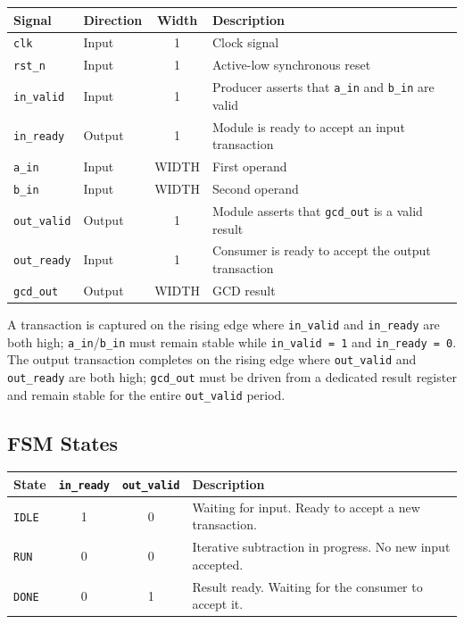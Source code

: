 \documentclass[11pt,a4paper]{article}
\begin{document}
\begin{table}[H]
\centering
\begin{tabular}{llcp{7.5cm}}
\toprule
Signal & Direction & Width & Description \\
\midrule
\texttt{clk}       & Input  & 1     & Clock signal \\
\texttt{rst\_n}    & Input  & 1     & Active-low synchronous reset \\
\texttt{in\_valid} & Input  & 1     & Producer asserts that \texttt{a\_in} and \texttt{b\_in} are valid \\
\texttt{in\_ready} & Output & 1     & Module is ready to accept an input transaction \\
\texttt{a\_in}     & Input  & WIDTH & First operand \\
\texttt{b\_in}     & Input  & WIDTH & Second operand \\
\texttt{out\_valid}& Output & 1     & Module asserts that \texttt{gcd\_out} is a valid result \\
\texttt{out\_ready}& Input  & 1     & Consumer is ready to accept the output transaction \\
\texttt{gcd\_out}  & Output & WIDTH & GCD result \\
\bottomrule
\end{tabular}
\end{table}

A transaction is captured on the rising edge where \texttt{in\_valid} and \texttt{in\_ready}
are both high; \texttt{a\_in}/\texttt{b\_in} must remain stable while \texttt{in\_valid = 1}
and \texttt{in\_ready = 0}. The output transaction completes on the rising edge where
\texttt{out\_valid} and \texttt{out\_ready} are both high; \texttt{gcd\_out} must be driven
from a dedicated result register and remain stable for the entire \texttt{out\_valid} period.

\subsection*{FSM States}

\begin{table}[H]
\centering
\begin{tabular}{lccp{7.5cm}}
\toprule
State & \texttt{in\_ready} & \texttt{out\_valid} & Description \\
\midrule
\texttt{IDLE} & 1 & 0 & Waiting for input. Ready to accept a new transaction. \\
\texttt{RUN}  & 0 & 0 & Iterative subtraction in progress. No new input accepted. \\
\texttt{DONE} & 0 & 1 & Result ready. Waiting for the consumer to accept it. \\
\bottomrule
\end{tabular}
\end{table}
\end{document}
